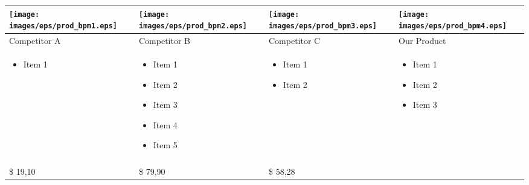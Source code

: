 \documentclass[11pt]{article}
\begin{document}
\begin{tabular}{| m{92 pt} | m{92 pt} | m{92 pt} | m{92 pt} |}\hline
	\texttt{[image: images/eps/prod\_bpm1.eps]} & 
		\texttt{[image: images/eps/prod\_bpm2.eps]} & 
		\texttt{[image: images/eps/prod\_bpm3.eps]} & 
		\texttt{[image: images/eps/prod\_bpm4.eps]} \\ \hline
	Competitor A & Competitor B & Competitor C & Our Product\\ \hline
	\begin{itemize} \tiny \item Item 1 \end{itemize} & 
					\begin{itemize} \tiny 
							\item Item 1
							\item Item 2
							\item Item 3
							\item Item 4
							\item Item 5\end{itemize} & 
					\begin{itemize} \tiny 
							\item Item 1
							\item Item 2\end{itemize}& 
					\begin{itemize} \tiny 
							\item Item 1
							\item Item 2
							\item Item 3 \end{itemize} \\
	& & & \\ \hline
	\$ 19,10 & \$ 79,90 & \$ 58,28 & \\ \hline
\end{tabular}
\end{document}
